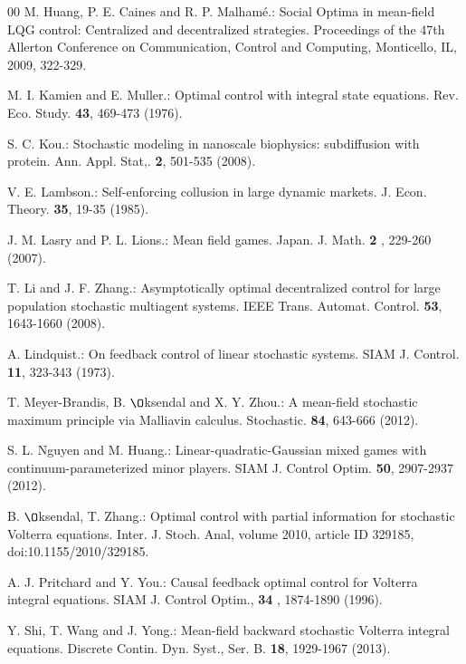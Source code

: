 \documentclass[11pt]{article}
\begin{document}
\begin{thebibliography}{00}
 M. Huang, P. E. Caines and R. P. Malham\'{e}.: Social Optima in mean-field LQG control: Centralized and
decentralized strategies. Proceedings of the 47th Allerton
Conference on Communication, Control and Computing, Monticello, IL,
2009, 322-329.



 M. I. Kamien and E. Muller.: Optimal control with integral state
equations. Rev. Eco. Study. \textbf{43}, 469-473 (1976).

 S. C. Kou.: Stochastic modeling in nanoscale biophysics: subdiffusion with
 protein. Ann. Appl. Stat,. \textbf{2}, 501-535 (2008).


 V. E. Lambson.: Self-enforcing collusion in large dynamic
markets. J. Econ. Theory. \textbf{35}, 19-35 (1985).



 J. M. Lasry and P. L. Lions.: Mean field
games. Japan. J. Math. \textbf{2 }, 229-260 (2007).

 T. Li and J. F. Zhang.: Asymptotically optimal decentralized control for
large population stochastic multiagent systems. IEEE Trans.
Automat. Control. \textbf{53}, 1643-1660 (2008).

 A. Lindquist.: On feedback control of linear stochastic
systems. SIAM J. Control. \textbf{11}, 323-343 (1973).


 T. Meyer-Brandis, B. ${\O}$ksendal and X. Y. Zhou.:
A mean-field stochastic maximum principle via Malliavin
calculus. Stochastic. \textbf{84}, 643-666 (2012).


 S. L. Nguyen and M. Huang.: Linear-quadratic-Gaussian mixed games with
continuum-parameterized minor players. SIAM J. Control Optim. \textbf{50}, 2907-2937 (2012).

 B. ${\O}$ksendal, T. Zhang.: Optimal control
with partial information for stochastic Volterra equations. Inter.
J. Stoch. Anal, volume 2010, article ID 329185,
doi:10.1155/2010/329185.

 A. J. Pritchard and Y. You.: Causal feedback optimal control for Volterra integral
equations. SIAM J. Control Optim., \textbf{34 }, 1874-1890 (1996).


 Y. Shi, T. Wang and J. Yong.: Mean-field backward stochastic
Volterra integral equations. Discrete Contin. Dyn. Syst., Ser. B.
\textbf{18}, 1929-1967 (2013).


\end{thebibliography}
\end{document}
